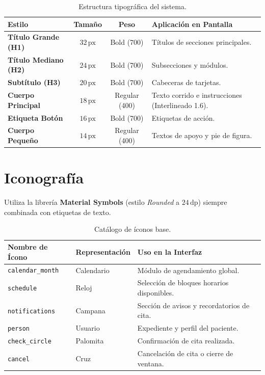 \documentclass[12pt,a4paper]{article}
\begin{document}
\begin{table}[htbp]
\centering
\small
\begin{tabular}{|l|c|c|p{6.5cm}|}
\hline
\rowcolor{Superficie} \textbf{Estilo} & \textbf{Tamaño} & \textbf{Peso} & \textbf{Aplicación en Pantalla} \\ \hline
\textbf{Título Grande (H1)} & $32\,\text{px}$ & Bold (700) & Títulos de secciones principales. \\ \hline
\textbf{Título Mediano (H2)} & $24\,\text{px}$ & Bold (700) & Subsecciones y módulos. \\ \hline
\textbf{Subtítulo (H3)} & $20\,\text{px}$ & Bold (700) & Cabeceras de tarjetas. \\ \hline
\textbf{Cuerpo Principal} & $18\,\text{px}$ & Regular (400) & Texto corrido e instrucciones (Interlineado 1.6). \\ \hline
\textbf{Etiqueta Botón} & $16\,\text{px}$ & Bold (700) & Etiquetas de acción. \\ \hline
\textbf{Cuerpo Pequeño} & $14\,\text{px}$ & Regular (400) & Textos de apoyo y pie de figura. \\ \hline
\end{tabular}
\caption{Estructura tipográfica del sistema.}
\end{table}

\section{Iconografía}
Utiliza la librería \textbf{Material Symbols} (estilo \textit{Rounded} a $24\,\text{dp}$) siempre combinada con etiquetas de texto.

\begin{table}[htbp]
\centering
\small
\begin{tabular}{|l|l|p{7.5cm}|}
\hline
\rowcolor{Superficie} \textbf{Nombre de Ícono} & \textbf{Representación} & \textbf{Uso en la Interfaz} \\ \hline
\texttt{calendar\_month} & Calendario & Módulo de agendamiento global. \\ \hline
\texttt{schedule} & Reloj & Selección de bloques horarios disponibles. \\ \hline
\texttt{notifications} & Campana & Sección de avisos y recordatorios de cita. \\ \hline
\texttt{person} & Usuario & Expediente y perfil del paciente. \\ \hline
\texttt{check\_circle} & Palomita & Confirmación de cita realizada. \\ \hline
\texttt{cancel} & Cruz & Cancelación de cita o cierre de ventana. \\ \hline
\end{tabular}
\caption{Catálogo de íconos base.}
\end{table}
\end{document}
